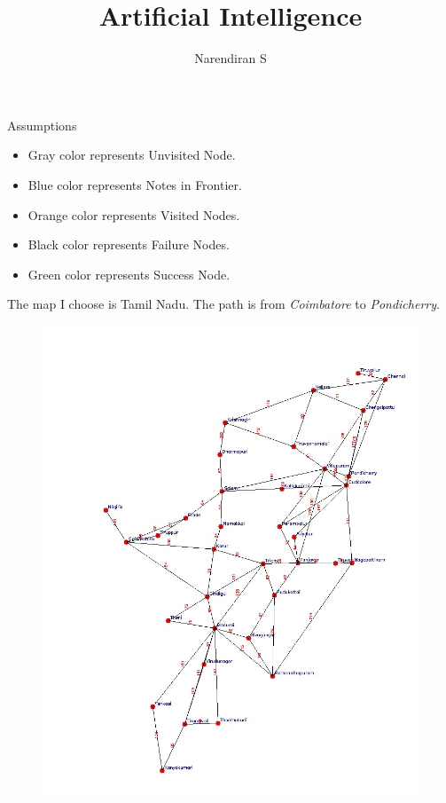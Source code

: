 \documentclass[xcolor=table]{beamer}
\title[Artificial Intelligence]{Artificial Intelligence} %
\author[Narendiran]{Narendiran S} %
\institute[NIT Calicut] %
{Department of Electronics and Communication Engineering\\
National Institute of Technology, Calicut\\
}
\newcommand{\drawMineUnvisited}[1]{\draw [lightgray, fill=lightgray, fill opacity=0.5] #1 circle [radius=0.4]}
\newcommand{\drawMineFrontier}[1]{\draw [SkyBlue, fill=SkyBlue, fill opacity=0.5] #1 circle [radius=0.4]}
\newcommand{\drawMineVisited}[1]{\draw [orange, fill=orange, fill opacity=0.5] #1 circle [radius=0.4]}
\newcommand{\drawMineFound}[1]{\draw [green, fill=green, fill opacity=0.5] #1 circle [radius=0.4]}
\newcommand{\drawMineNotFound}[1]{\draw [black, fill=black, fill opacity=0.9] #1 circle [radius=0.4]}
\begin{document}
\begin{frame}
\titlepage
\end{frame}

\begin{frame}{Assumptions}
  \begin{itemize}
    \item Gray color represents Unvisited Node.
    \item Blue color represents Notes in Frontier.
    \item Orange color represents Visited Nodes.
    \item Black color represents Failure Nodes.
    \item Green color represents Success Node.
  \end{itemize}
  \vspace*{0.5cm}
  \begin{center}
  \end{center}
\end{frame}

\begin{frame}
The map I choose is Tamil Nadu.
The path is from \emph{Coimbatore} to \emph{Pondicherry}.
\begin{figure}[H]
\includegraphics[height=0.9\textheight]{tamilNaduOutlinePath.jpg}
\end{figure}
\end{frame}
\end{document}
